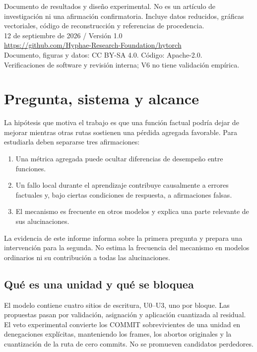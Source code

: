\documentclass[11pt,a4paper]{article}
\newcommand{\pageend}{\clearpage}
\begin{document}
\vfill
{\small\color{muted}
Documento de resultados y diseño experimental. No es un artículo de investigación
ni una afirmación confirmatoria. Incluye datos reducidos, gráficas vectoriales,
código de reconstrucción y referencias de procedencia.\\[4pt]
12 de septiembre de 2026 \quad / \quad Versión 1.0\\
\url{https://github.com/Hyphae-Research-Foundation/hytorch}\\[4pt]
Documento, figuras y datos: CC BY-SA 4.0. Código: Apache-2.0.\\
Verificaciones de software y revisión interna; V6 no tiene validación empírica.}

\pageend
\section{Pregunta, sistema y alcance}
\label{sec:scope}

La hipótesis que motiva el trabajo es que una función factual podría dejar de
mejorar mientras otras rutas sostienen una pérdida agregada favorable. Para
estudiarla deben separarse tres afirmaciones:

\begin{enumerate}
\item Una métrica agregada puede ocultar diferencias de desempeño entre funciones.
\item Un fallo local durante el aprendizaje contribuye causalmente a errores
factuales y, bajo ciertas condiciones de respuesta, a afirmaciones falsas.
\item El mecanismo es frecuente en otros modelos y explica una parte relevante
de sus alucinaciones.
\end{enumerate}

La evidencia de este informe informa sobre la primera pregunta y prepara una
intervención para la segunda. No estima la frecuencia del mecanismo en modelos
ordinarios ni su contribución a todas las alucinaciones.

\subsection{Qué es una unidad y qué se bloquea}
El modelo contiene cuatro sitios de escritura, U0--U3, uno por bloque. Las
propuestas pasan por validación, asignación y aplicación cuantizada al residual.
El veto experimental convierte los COMMIT sobrevivientes de una unidad en
denegaciones explícitas, manteniendo los frames, los abortos originales y la
cuantización de la ruta de cero commits. No se promueven candidatos perdedores.
\end{document}
